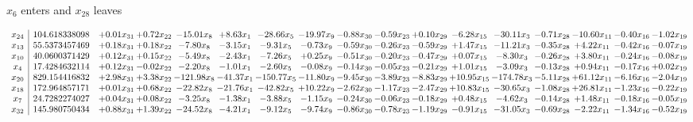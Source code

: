 \documentclass[9pt]{article}
\begin{document}
 $ x_{6} $ enters and $ x_{28} $ leaves 

 \[\begin{array}{c| c c@{\hskip 2pt} c@{\hskip 2pt} c@{\hskip 2pt} c@{\hskip 2pt} c@{\hskip 2pt} c@{\hskip 2pt} c@{\hskip 2pt} c@{\hskip 2pt} c@{\hskip 2pt} c@{\hskip 2pt} c@{\hskip 2pt} c@{\hskip 2pt} c@{\hskip 2pt} c@{\hskip 2pt} c@{\hskip 2pt} }
 x_{24}   &  104.618338098 & +  0.01 x_{31} & +  0.72 x_{22} & -15.01 x_{8} & +  8.63 x_{1} & -28.66 x_{5} & -19.97 x_{9} & -0.88 x_{30} & -0.59 x_{23} & +  0.10 x_{29} & -6.28 x_{15} & -30.11 x_{3} & -0.71 x_{28} & -10.60 x_{11} & -0.40 x_{16} & -1.02 x_{19}\\
 x_{13}   &  55.5373457469 & +  0.18 x_{31} & +  0.18 x_{22} & -7.80 x_{8} & -3.15 x_{1} & -9.31 x_{5} & -0.73 x_{9} & -0.59 x_{30} & -0.26 x_{23} & -0.59 x_{29} & +  1.47 x_{15} & -11.21 x_{3} & -0.35 x_{28} & +  4.22 x_{11} & -0.42 x_{16} & -0.07 x_{19}\\
 x_{10}   &  40.0600371429 & +  0.12 x_{31} & +  0.15 x_{22} & -5.49 x_{8} & -2.43 x_{1} & -7.26 x_{5} & +  0.25 x_{9} & -0.51 x_{30} & -0.20 x_{23} & -0.47 x_{29} & +  0.07 x_{15} & -8.30 x_{3} & -0.26 x_{28} & +  3.80 x_{11} & -0.24 x_{16} & -0.08 x_{19}\\
 x_{4}   &  17.4284632114 & +  0.12 x_{31} & -0.02 x_{22} & -2.20 x_{8} & -1.01 x_{1} & -2.60 x_{5} & -0.08 x_{9} & -0.14 x_{30} & -0.05 x_{23} & -0.21 x_{29} & +  1.01 x_{15} & -3.09 x_{3} & -0.13 x_{28} & +  0.94 x_{11} & -0.17 x_{16} & +  0.02 x_{19}\\
 x_{20}   &  829.154416832 & +  2.98 x_{31} & +  3.38 x_{22} & -121.98 x_{8} & -41.37 x_{1} & -150.77 x_{5} & -11.80 x_{9} & -9.45 x_{30} & -3.89 x_{23} & -8.83 x_{29} & + 10.95 x_{15} & -174.78 x_{3} & -5.11 x_{28} & + 61.12 x_{11} & -6.16 x_{16} & -2.04 x_{19}\\
 x_{18}   &  172.964857171 & +  0.01 x_{31} & +  0.68 x_{22} & -22.82 x_{8} & -21.76 x_{1} & -42.82 x_{5} & + 10.22 x_{9} & -2.62 x_{30} & -1.17 x_{23} & -2.47 x_{29} & + 10.83 x_{15} & -30.65 x_{3} & -1.08 x_{28} & + 26.81 x_{11} & -1.23 x_{16} & -0.22 x_{19}\\
 x_{7}   &  24.7282274027 & +  0.04 x_{31} & +  0.08 x_{22} & -3.25 x_{8} & -1.38 x_{1} & -3.88 x_{5} & -1.15 x_{9} & -0.24 x_{30} & -0.06 x_{23} & -0.18 x_{29} & +  0.48 x_{15} & -4.62 x_{3} & -0.14 x_{28} & +  1.48 x_{11} & -0.18 x_{16} & -0.05 x_{19}\\
 x_{32}   &  145.980750434 & +  0.88 x_{31} & +  1.39 x_{22} & -24.52 x_{8} & -4.21 x_{1} & -9.12 x_{5} & -9.74 x_{9} & -0.86 x_{30} & -0.78 x_{23} & -1.19 x_{29} & -0.91 x_{15} & -31.05 x_{3} & -0.69 x_{28} & -2.22 x_{11} & -1.34 x_{16} & -0.52 x_{19}\\

\end{array}\]
\end{document}

